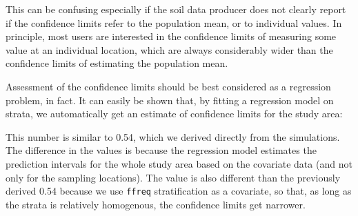 \documentclass[graybox,natbib,nospthms,UStrade]{svmono}
\newenvironment{Shaded}{\begin{snugshade}}{\end{snugshade}}
\newcommand{\CommentTok}[1]{\textcolor[rgb]{0.37,0.37,0.37}{\textit{#1}}}
\newcommand{\ControlFlowTok}[1]{\textcolor[rgb]{0.27,0.27,0.27}{\textbf{#1}}}
\newcommand{\DataTypeTok}[1]{\textcolor[rgb]{0.27,0.27,0.27}{#1}}
\newcommand{\DecValTok}[1]{\textcolor[rgb]{0.06,0.06,0.06}{#1}}
\newcommand{\KeywordTok}[1]{\textcolor[rgb]{0.27,0.27,0.27}{\textbf{#1}}}
\newcommand{\NormalTok}[1]{#1}
\newcommand{\OperatorTok}[1]{\textcolor[rgb]{0.43,0.43,0.43}{\textbf{#1}}}
\newcommand{\OtherTok}[1]{\textcolor[rgb]{0.37,0.37,0.37}{#1}}
\newcommand{\StringTok}[1]{\textcolor[rgb]{0.5,0.5,0.5}{#1}}
\begin{document}
\begin{Shaded}
\end{Shaded}

This can be confusing especially if the soil data producer does not
clearly report if the confidence limits refer to the population mean, or
to individual values. In principle, most users are interested in
the confidence limits of measuring some value at an individual
location, which are always considerably wider than the confidence limits of
estimating the population mean.

Assessment of the confidence limits should be best considered as a
regression problem, in fact. It can easily be shown that, by fitting a
regression model on strata, we automatically get an estimate of
confidence limits for the study area:

\begin{Shaded}
\end{Shaded}

This number is similar to 0.54, which we derived directly from the simulations. The
difference in the values is because the regression model estimates the
prediction intervals for the whole study area based on the covariate data
(and not only for the sampling locations). The value is also different
than the previously derived 0.54 because we use \texttt{ffreq} stratification as a
covariate, so that, as long as the strata is relatively homogenous, the
confidence limits get narrower.
\end{document}
